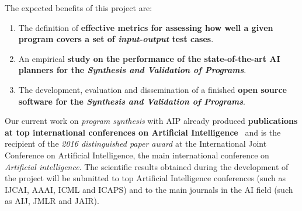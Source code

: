 \documentclass[10pt,a4paper]{paper}
\begin{document}
The expected benefits of this project are:
\begin{enumerate}
\item The definition of {\bf effective metrics for assessing how well a given program covers a set of {\em input-output} test cases}.
\item An empirical {\bf study on the performance of the state-of-the-art AI planners for the {\em Synthesis and Validation of Programs}}.
\item The development, evaluation and dissemination of a finished {\bf open source software for the {\em Synthesis and Validation of Programs}}.
\end{enumerate}

Our current work on {\em program synthesis} with AIP already produced {\bf publications at top international conferences on Artificial Intelligence}~\cite{segovia2017generating,sergio:aprogramingb:ijcai16,sergio:aprograming:ijcai16,sergio:aprograming:icaps16} and is the recipient of the {\it 2016 distinguished paper award} at the International Joint Conference on Artificial Intelligence, the main international conference on {\em Artificial intelligence}. The scientific results obtained during the development of the project will be submitted to top Artificial Intelligence conferences (such as IJCAI, AAAI, ICML and ICAPS) and to the main journals in the AI field (such as AIJ, JMLR and JAIR).

\begin{tiny}

\end{tiny}

\end{document}
